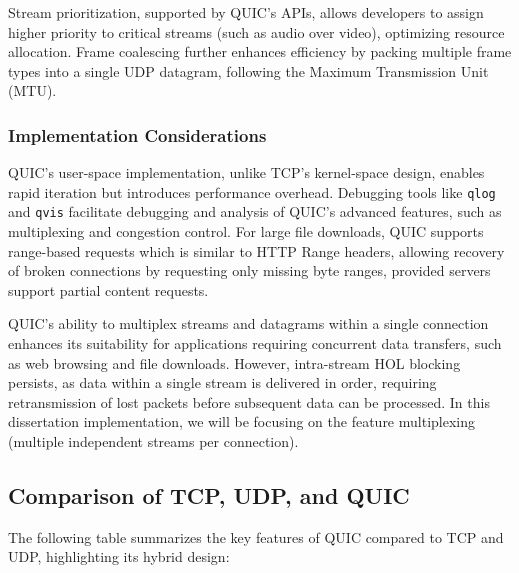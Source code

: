 Stream prioritization, supported by QUIC’s APIs, allows developers to assign higher priority to critical streams (such as audio over video), optimizing resource allocation. Frame coalescing further enhances efficiency by packing multiple frame types into a single UDP datagram, following the Maximum Transmission Unit (MTU).

\subsubsection{Implementation Considerations}

QUIC’s user-space implementation, unlike TCP’s kernel-space design, enables rapid iteration but introduces performance overhead. Debugging tools like \texttt{qlog} and \texttt{qvis} facilitate debugging and analysis of QUIC’s advanced features, such as multiplexing and congestion control. For large file downloads, QUIC supports range-based requests which is similar to HTTP Range headers, allowing recovery of broken connections by requesting only missing byte ranges, provided servers support partial content requests.

QUIC’s ability to multiplex streams and datagrams within a single connection enhances its suitability for applications requiring concurrent data transfers, such as web browsing and file downloads. However, intra-stream HOL blocking persists, as data within a single stream is delivered in order, requiring retransmission of lost packets before subsequent data can be processed. In this dissertation implementation, we will be focusing on the feature multiplexing (multiple independent streams per connection).

\subsection{Comparison of TCP, UDP, and QUIC}

The following table summarizes the key features of QUIC compared to TCP and UDP, highlighting its hybrid design:

